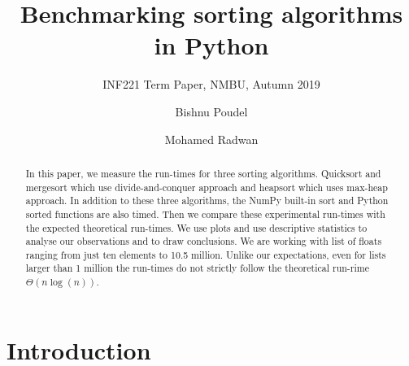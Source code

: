 \documentclass[sigconf, nonacm, natbib, screen, balance=False]{acmart}
\begin{document}
\title{Benchmarking sorting algorithms in Python}
\subtitle{INF221 Term Paper, NMBU, Autumn 2019}

\author{Bishnu Poudel}

\author{Mohamed Radwan}

\begin{abstract}

In this paper, we measure the run-times for three sorting algorithms. Quicksort and mergesort which use divide-and-conquer approach and heapsort which uses max-heap approach. In addition to these three algorithms, the NumPy built-in sort and Python sorted functions are also timed. Then we compare these experimental run-times with the expected theoretical run-times. We use plots and use descriptive statistics to analyse our observations and to draw conclusions. We are working with list of floats ranging from just ten elements to 10.5 million. Unlike our expectations, even for lists larger than 1 million the run-times do not strictly follow the theoretical run-rime $\Theta\left(n\log\left(n\right)\right)$.
\end{abstract}
\maketitle
\section{Introduction}\label{sec:intro}
\end{document}
